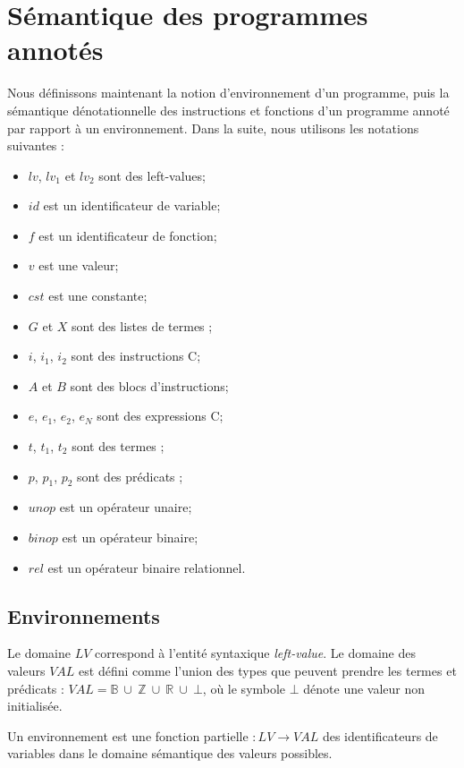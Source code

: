 \section{Sémantique des programmes annotés}
\label{sec:lang-semantics}


Nous définissons maintenant la notion d'environnement d'un programme, puis la
sémantique dénotationnelle des instructions et fonctions d'un programme
annoté par rapport à un environnement.
Dans la suite, nous utilisons les notations suivantes :
\begin{itemize}
\item $lv$, $lv_1$ et $lv_2$ sont des left-values;
\item $id$ est un identificateur de variable;
\item $f$ est un identificateur de fonction;
\item $v$ est une valeur;
\item $cst$ est une constante;
\item $G$ et $X$ sont des listes de termes \eacsl;
\item $i$, $i_1$, $i_2$ sont des instructions C;
\item $A$ et $B$ sont des blocs d'instructions;
\item $e$, $e_1$, $e_2$, $e_N$ sont des expressions C;
\item $t$, $t_1$, $t_2$ sont des termes \eacsl;
\item $p$, $p_1$, $p_2$ sont des prédicats \eacsl;
\item $unop$ est un opérateur unaire;
\item $binop$ est un opérateur binaire;
\item $rel$ est un opérateur binaire relationnel.
\end{itemize}


\subsection{Environnements}


Le domaine $LV$ correspond à l'entité syntaxique \textit{left-value}.
Le domaine des valeurs $VAL$ est défini comme l'union des types que
peuvent prendre les termes et prédicats \eacsl :
$VAL = \mathbb{B}~\cup~\mathbb{Z}~\cup~\mathbb{R}~\cup~\bot$, où le symbole
$\bot$ dénote une valeur non initialisée.

Un environnement \env est une fonction partielle \env $: LV \rightarrow VAL$ des
identificateurs de variables dans le domaine sémantique des valeurs
possibles.

